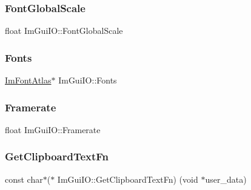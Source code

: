\hypertarget{struct_im_gui_i_o_a74a64a74dcbe2a6ef0c1ef56ba328094}{}\label{struct_im_gui_i_o_a74a64a74dcbe2a6ef0c1ef56ba328094} 
\subsubsection{\texorpdfstring{Font\+Global\+Scale}{FontGlobalScale}}
{\footnotesize\ttfamily float Im\+Gui\+I\+O\+::\+Font\+Global\+Scale}

\hypertarget{struct_im_gui_i_o_a24e4f5201fe8780267abc2acfc24254c}{}\label{struct_im_gui_i_o_a24e4f5201fe8780267abc2acfc24254c} 
\subsubsection{\texorpdfstring{Fonts}{Fonts}}
{\footnotesize\ttfamily \hyperlink{struct_im_font_atlas}{Im\+Font\+Atlas}$\ast$ Im\+Gui\+I\+O\+::\+Fonts}

\hypertarget{struct_im_gui_i_o_a8c6c2be54ddeda3cfb4a73cf95701a54}{}\label{struct_im_gui_i_o_a8c6c2be54ddeda3cfb4a73cf95701a54} 
\subsubsection{\texorpdfstring{Framerate}{Framerate}}
{\footnotesize\ttfamily float Im\+Gui\+I\+O\+::\+Framerate}

\hypertarget{struct_im_gui_i_o_ab7face2b2efef720a22a7fb2143d415c}{}\label{struct_im_gui_i_o_ab7face2b2efef720a22a7fb2143d415c} 
\subsubsection{\texorpdfstring{Get\+Clipboard\+Text\+Fn}{GetClipboardTextFn}}
{\footnotesize\ttfamily const char$\ast$($\ast$ Im\+Gui\+I\+O\+::\+Get\+Clipboard\+Text\+Fn) (void $\ast$user\+\_\+data)}

\hypertarget{struct_im_gui_i_o_ac59559342608fbdeb14778a4fd57c301}{}\label{struct_im_gui_i_o_ac59559342608fbdeb14778a4fd57c301} 
